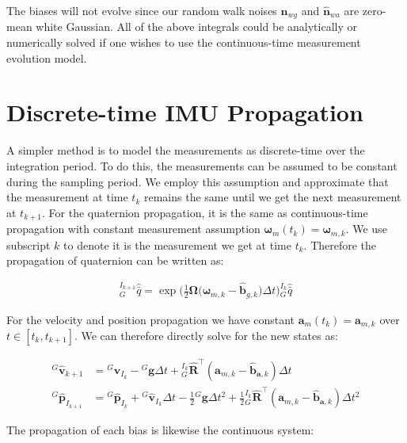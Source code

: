 The biases will not evolve since our random walk noises $\hat{\mathbf{n}}_{wg}$ and $\hat{\mathbf{n}}_{wa}$ are zero-\/mean white Gaussian. All of the above integrals could be analytically or numerically solved if one wishes to use the continuous-\/time measurement evolution model.\hypertarget{propagation_disc_prop}{}\section{Discrete-\/time I\+M\+U Propagation}\label{propagation_disc_prop}
A simpler method is to model the measurements as discrete-\/time over the integration period. To do this, the measurements can be assumed to be constant during the sampling period. We employ this assumption and approximate that the measurement at time $t_k$ remains the same until we get the next measurement at $t_{k+1}$. For the quaternion propagation, it is the same as continuous-\/time propagation with constant measurement assumption ${\boldsymbol{\omega}}_{m}(t_k) = {\boldsymbol{\omega}}_{m,k}$. We use subscript $k$ to denote it is the measurement we get at time $t_k$. Therefore the propagation of quaternion can be written as\+:

\begin{align*} \text{}^{I_{k+1}}_{G}\hat{\bar{q}} = \exp\bigg(\frac{1}{2}\boldsymbol{\Omega}\big({\boldsymbol{\omega}}_{m,k}-\hat{\mathbf{b}}_{g,k}\big)\Delta t\bigg) \text{}^{I_{k}}_{G}\hat{\bar{q}} \end{align*}

For the velocity and position propagation we have constant $\mathbf{a}_{m}(t_k) = \mathbf{a}_{m,k}$ over $t \in [t_k, t_{k+1}]$. We can therefore directly solve for the new states as\+:

\begin{align*} ^G\hat{\mathbf{v}}_{k+1} &= \text{}^G\hat{\mathbf{v}}_{I_k} - {}^G\mathbf{g}\Delta t +\text{}^{I_k}_G\hat{\mathbf{R}}^\top(\mathbf{a}_{m,k} - \hat{\mathbf{b}}_{\mathbf{a},k})\Delta t\\ ^G\hat{\mathbf{p}}_{I_{k+1}} &= \text{}^G\hat{\mathbf{p}}_{I_k} + {}^G\hat{\mathbf{v}}_{I_k} \Delta t - \frac{1}{2}{}^G\mathbf{g}\Delta t^2 + \frac{1}{2} \text{}^{I_k}_{G}\hat{\mathbf{R}}^\top(\mathbf{a}_{m,k} - \hat{\mathbf{b}}_{\mathbf{a},k})\Delta t^2 \end{align*}

The propagation of each bias is likewise the continuous system\+:

